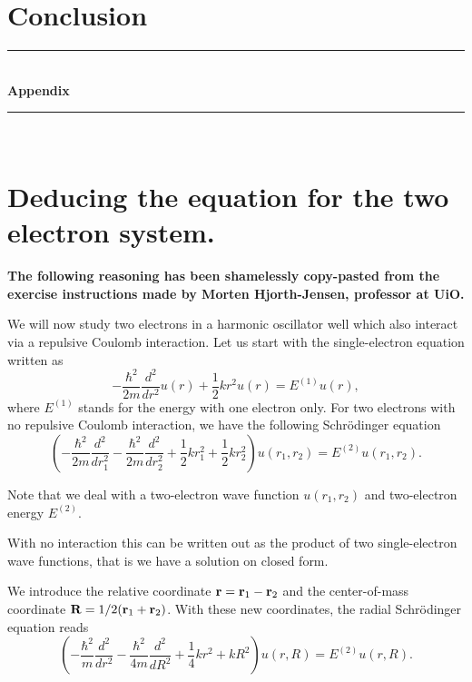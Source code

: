 \documentclass[a4paper,10pt,english]{article}
\numberwithin{figure}{subsection}
\numberwithin{table}{subsection}
\numberwithin{equation}{subsection}
\newcommand{\HRule}{\rule{\linewidth}{0.5mm}}
\begin{document}
\clearpage
\section{Conclusion}



















\clearpage
\begin{appendices}
\HRule \\[0.4cm]
{ \huge \bfseries Appendix \\[0.4cm] }

\HRule \\[0.0cm]
\section{Deducing the equation for the two electron system.} \label{sec:2elec}

\textbf{The following reasoning has been shamelessly copy-pasted from the 
exercise instructions made by Morten Hjorth-Jensen, professor at UiO.}

We will now study two electrons in a harmonic oscillator well which
also interact via a repulsive Coulomb interaction.
Let us start with the single-electron equation written as
\[
  -\frac{\hbar^2}{2 m} \frac{d^2}{dr^2} u(r) 
       + \frac{1}{2}k r^2u(r)  = E^{(1)} u(r),
\]
where $E^{(1)}$ stands for the energy with one electron only.
For two electrons with no repulsive Coulomb interaction, we have the following 
Schr\"odinger equation
\[
\left(  -\frac{\hbar^2}{2 m} \frac{d^2}{dr_1^2} -\frac{\hbar^2}{2 m} \frac{d^2}{dr_2^2}+ \frac{1}{2}k r_1^2+ \frac{1}{2}k r_2^2\right)u(r_1,r_2)  = E^{(2)} u(r_1,r_2) .
\]


Note that we deal with a two-electron wave function $u(r_1,r_2)$ and 
two-electron energy $E^{(2)}$.

With no interaction this can be written out as the product of two
single-electron wave functions, that is we have a solution on closed form.

We introduce the relative coordinate ${\bf r} = {\bf r}_1-{\bf r}_2$
and the center-of-mass coordinate ${\bf R} = 1/2({\bf r}_1+{\bf r}_2)$.
With these new coordinates, the radial Schr\"odinger equation reads
\[
\left(  -\frac{\hbar^2}{m} \frac{d^2}{dr^2} -\frac{\hbar^2}{4 m} \frac{d^2}{dR^2}+ \frac{1}{4} k r^2+  kR^2\right)u(r,R)  = E^{(2)} u(r,R).
\]


\end{appendices}
\end{document}
